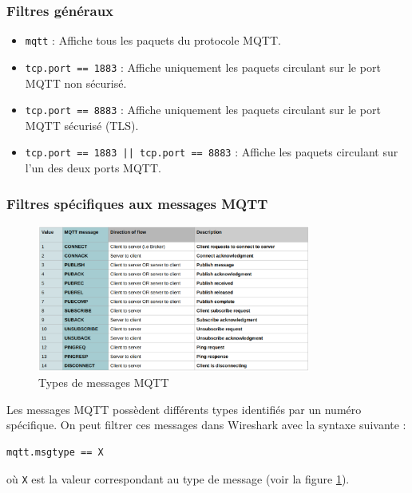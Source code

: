 \documentclass{article}
\begin{document}
\subsubsection{Filtres généraux}
\begin{itemize}
    \item \texttt{mqtt} : Affiche tous les paquets du protocole MQTT.
    \item \texttt{tcp.port == 1883} : Affiche uniquement les paquets circulant sur le port MQTT non sécurisé.
    \item \texttt{tcp.port == 8883} : Affiche uniquement les paquets circulant sur le port MQTT sécurisé (TLS).
    \item \texttt{tcp.port == 1883 || tcp.port == 8883} : Affiche les paquets circulant sur l'un des deux ports MQTT.
\end{itemize}

\subsubsection{Filtres spécifiques aux messages MQTT}

\begin{figure}[H]
    \centering
    \includegraphics[width=0.8\textwidth]{Images/msgtype.png}
    \caption{Types de messages MQTT}
    \label{fig:msgtype}
\end{figure}

Les messages MQTT possèdent différents types identifiés par un numéro spécifique. On peut filtrer ces messages dans Wireshark avec la syntaxe suivante :

\begin{verbatim}
mqtt.msgtype == X
\end{verbatim}

où \texttt{X} est la valeur correspondant au type de message (voir la figure \ref{fig:msgtype}).
\end{document}
